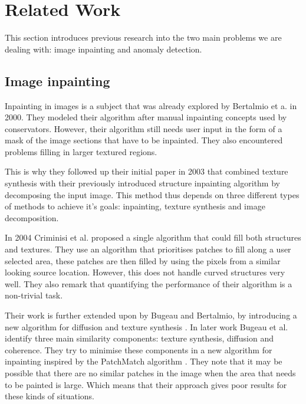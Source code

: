 \chapter{Related Work}\label{ch:related-work}

This section introduces previous research into the two main problems we are dealing with: image inpainting and anomaly detection.

\section{Image inpainting}
\label{sec:relwork:image-inpainting}

Inpainting in images is a subject that was already explored by Bertalmio et a. \cite{bertalmio_image_2000} in 2000. They modeled their algorithm after manual inpainting concepts used by conservators. However, their algorithm still needs user input in the form of a mask of the image sections that have to be inpainted. They also encountered problems filling in larger textured regions.

This is why they followed up their initial paper in 2003 \cite{bertalmio_simultaneous_2003} that combined texture synthesis with their previously introduced structure inpainting algorithm by decomposing the input image. This method thus depends on three different types of methods to achieve it's goals: inpainting, texture synthesis and image decomposition. 

In 2004 Criminisi et al. \cite{criminisi_region_2004} proposed a single algorithm that could fill both structures and textures. They use an algorithm that prioritises patches to fill along a user selected area, these patches are then filled by using the pixels from a similar looking source location. However, this does not handle curved structures very well. They also remark that quantifying the performance of their algorithm is a non-trivial task.

Their work is further extended upon by Bugeau and Bertalmio, by introducing a new algorithm for diffusion and texture synthesis \cite{bugeau_combining_2009}. In later work Bugeau et al. \cite{bugeau_comprehensive_2010} identify three main similarity components: texture synthesis, diffusion and coherence. They try to minimise these components in a new algorithm for inpainting inspired by the PatchMatch algorithm \cite{barnes_patchmatch_2009}. They note that it may be possible that there are no similar patches in the image when the area that needs to be painted is large. Which means that their approach gives poor results for these kinds of situations.

